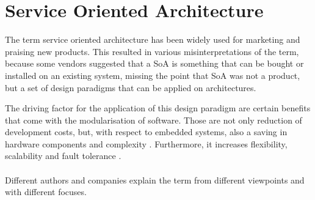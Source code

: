 \section{Service Oriented Architecture}
\label{ch:soa}

The term service oriented architecture has been widely used for marketing and praising new products. This resulted in various misinterpretations of the term, because some vendors suggested that a SoA is something that can be bought or installed on an existing system, missing the point that SoA was not a product, but a set of design paradigms that can be applied on architectures.

The driving factor for the application of this design paradigm are certain benefits that come with the modularisation of software. Those are not only reduction of development costs, but, with respect to embedded systems, also a saving in hardware components and complexity \cite{sommer}. Furthermore, it increases flexibility, scalability and fault tolerance \cite[p.33]{rosen} \cite[p.17-18]{josuttis}.
\\
\\
Different authors and companies explain the term from different viewpoints and with different focuses.

